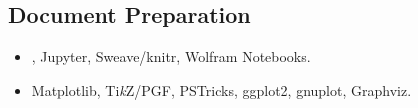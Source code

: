 \documentclass[version=last, fontsize=10pt, paper=A4, toc=bibliography]{scrartcl}%
\begin{document}
\subsection*{Document Preparation}\label{subsec:document-preparation}

\begin{itemize}[leftmargin=*]
\item {}, Jupyter, Sweave/knitr, Wolfram Notebooks.%
\item Matplotlib, Ti\emph{k}Z/PGF, PSTricks, ggplot2, gnuplot, Graphviz.
\end{itemize}

\printbibliography[title=Publications]
\end{document}
